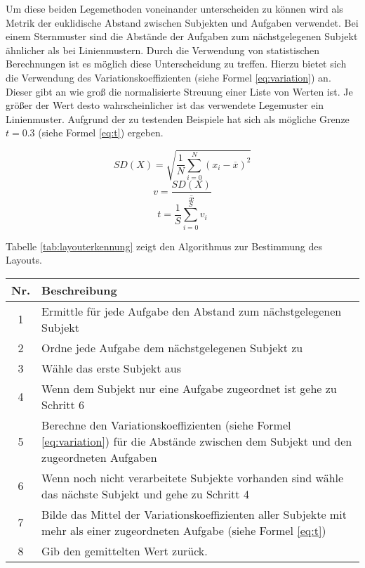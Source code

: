 Um diese beiden Legemethoden voneinander unterscheiden zu können wird als Metrik der euklidische Abstand zwischen Subjekten und Aufgaben verwendet. Bei einem Sternmuster sind die Abstände der Aufgaben zum nächstgelegenen Subjekt ähnlicher als bei Linienmustern. Durch die Verwendung von statistischen Berechnungen ist es möglich diese Unterscheidung zu treffen. Hierzu bietet sich die Verwendung des Variationskoeffizienten (siehe Formel \ref{eq:variation}) an. Dieser gibt an wie groß die normalisierte Streuung einer Liste von Werten ist. Je größer der Wert desto wahrscheinlicher ist das verwendete Legemuster ein Linienmuster. Aufgrund der zu testenden Beispiele hat sich als mögliche Grenze $t=0.3$ (siehe Formel \ref{eq:t}) ergeben. 

\begin{equation}
	\label{eq:deviation}
	SD(X)=\sqrt{\frac{1}{N}\sum_{i=0}^{N}\left(x_i - \overline{x}\right)^2} 
\end{equation}
\begin{equation}
	\label{eq:variation}
	v=\frac{SD(X)}{\overline{x}} 
\end{equation}
\begin{equation}
	\label{eq:t}
	t=\frac{1}{S}\sum_{i=0}^{S}v_{i}
\end{equation}

Tabelle \ref{tab:layouterkennung} zeigt den Algorithmus zur Bestimmung des Layouts.
\begin{center}
	\label{tab:layouterkennung}
	\begin{tabularx}
		{1.0\linewidth}{ c X } \textbf{Nr.} & \textbf{Beschreibung} \\
		\hline 1 & Ermittle für jede Aufgabe den Abstand zum nächstgelegenen Subjekt \\
		\hline 2 & Ordne jede Aufgabe dem nächstgelegenen Subjekt zu \\
		\hline 3 & Wähle das erste Subjekt aus \\
		\hline 4 & Wenn dem Subjekt nur eine Aufgabe zugeordnet ist gehe zu Schritt 6 \\
		\hline 5 & Berechne den Variationskoeffizienten (siehe Formel  \ref{eq:variation}) für die Abstände zwischen dem Subjekt und den zugeordneten Aufgaben \\
		\hline 6 & Wenn noch nicht verarbeitete Subjekte vorhanden sind wähle das nächste Subjekt und gehe zu Schritt 4 \\
		\hline 7 & Bilde das Mittel der Variationskoeffizienten aller Subjekte mit mehr als einer zugeordneten Aufgabe (siehe Formel \ref{eq:t})\\
		\hline 8 & Gib den gemittelten Wert zurück.
	\end{tabularx}
\end{center}

